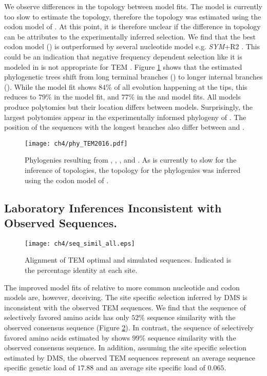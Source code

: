 We observe differences in the topology between model fits.
The \selac model is currently too slow to estimate the topology, therefore the topology was estimated using the codon model of \citet{KosiolEtAl07}.
At this point, it is therefore unclear if the difference in topology can be attributes to the experimentally inferred selection.
We find that the best codon model (\gy) \citep{GoldmanAndYang1994} is outperformed by several nucleotide model e.g. \emph{SYM}+R2 \citep{zharkikh1994}.
This could be an indication that negative frequency dependent selection like it is modeled in \gy is not appropriate for TEM \citep{GoldmanAndYang1994,beaulieu2018}.
Figure \ref{fig:phylo} shows that the estimated phylogenetic trees shift from long terminal branches (\selac) to longer internal branches (\phydms).
While the \selac model fit shows $84 \%$ of all evolution happening at the tips, this reduces to $79 \%$ in the \selacDMS model fit, and $77 \%$ in the \phydms and \gy model fits.
All models produce polytomies but their location differs between models.
Surprisingly, the largest polytomies appear in the experimentally informed phylogeny of \phydms.
The position of the sequences with the longest branches also differ between \selac and \phydms.

\singlespacing
\begin{figure}[H]
     \centering
	\texttt{[image: ch4/phy\_TEM2016.pdf]}
	\caption{Phylogenies resulting from \selac, \selacDMS, \phydms, and \gy. As \selac is currently to slow for the inference of topologies, the topology for the \selac phylogenies was inferred using the codon model of \citet{KosiolEtAl07}.}
	\label{fig:phylo}
\end{figure}
\doublespacing
\clearpage

\subsection{Laboratory Inferences Inconsistent with Observed Sequences.}

\singlespacing
\begin{figure}
     \centering
	\texttt{[image: ch4/seq\_simil\_all.eps]}
	\caption{Alignment of TEM optimal and simulated sequences. Indicated is the percentage identity at each site.}
	\label{fig:sim_seqs_cons}
\end{figure}
\doublespacing

The improved model fits of \phydms relative to more common nucleotide and codon models are, however, deceiving.
The site specific selection inferred by DMS is inconsistent with the observed TEM sequences.
We find that the sequence of selectively favored amino acids has only $52 \%$ sequence similarity with the observed consensus sequence (Figure \ref{fig:sim_seqs_cons}).
In contrast, the sequence of selectively favored amino acids estimated by \selac shows $99 \%$ sequence similarity with the observed consensus sequence.
In addition, assuming the site specific selection estimated by DMS, the observed TEM sequences represent an average sequence specific genetic load of $17.88$ and an average site specific load of $0.065$.

